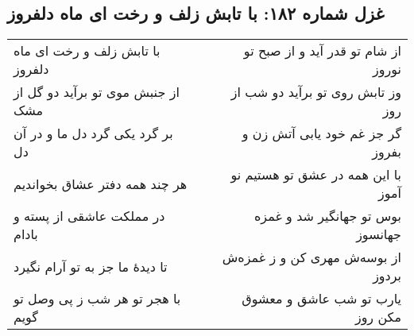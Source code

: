 \begin{center}
\section*{غزل شماره ۱۸۲: با تابش زلف و رخت ای ماه دلفروز}
\label{sec:182}
\begin{longtable}{l p{0.5cm} r}
با تابش زلف و رخت ای ماه دلفروز
&&
از شام تو قدر آید و از صبح تو نوروز
\\
از جنبش موی تو برآید دو گل از مشک
&&
وز تابش روی تو برآید دو شب از روز
\\
بر گرد یکی گرد دل ما و در آن دل
&&
گر جز غم خود یابی آتش زن و بفروز
\\
هر چند همه دفتر عشاق بخواندیم
&&
با این همه در عشق تو هستیم نو آموز
\\
در مملکت عاشقی از پسته و بادام
&&
بوس تو جهانگیر شد و غمزه جهانسوز
\\
تا دیدهٔ ما جز به تو آرام نگیرد
&&
از بوسه‌ش مهری کن و ز غمزه‌ش بردوز
\\
با هجر تو هر شب ز پی وصل تو گویم
&&
یارب تو شب عاشق و معشوق مکن روز
\\
\end{longtable}
\end{center}
